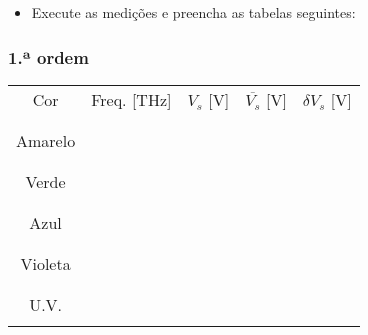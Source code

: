 \documentclass[a4paper,12pt]{article}  %
\begin{document}
\begin{itemize}
\item Execute as medições e preencha as tabelas seguintes:
\end{itemize}

\subsubsection{1.ª ordem}
\begin{center}
	\begin{tabular}{|c|c|c|c|c|}
	\hline
	Cor  & Freq. [THz] & $V_s$ [V] & $\overline{V_s}$ [V]	& $\delta V_s$ [V] \\
	 & & & & \\
	\hline
	 &  &  &  &  \\ \cline{3-3}
	Amarelo & &  & &   \\ \cline{3-3}
	& &  &  &    \\ 
	\hline
	 & &  &  &    \\ \cline{3-3}
	Verde & & & & \\ \cline{3-3}
	 &  &  &  &  \\ 
	\hline
	 &  &  &  &  \\ \cline{3-3}
	Azul & & & & \\ \cline{3-3}
	 &  &  &  &  \\ 
	\hline
	 &  &  &  &  \\ \cline{3-3}
	Violeta & & & & \\ \cline{3-3}
	 &  &  & &   \\ 
	\hline
	 &  &  &  &  \\ \cline{3-3}
	U.V. & & & & \\ \cline{3-3}
	 &  &  &  &  \\ 
	\hline
 	\end{tabular}
\end{center}
\end{document}
